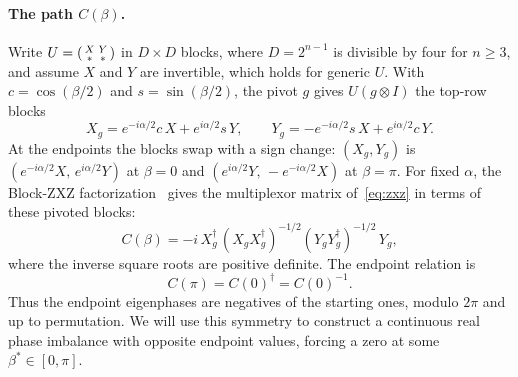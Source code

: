 \documentclass[11pt]{article}
\begin{document}
\paragraph{The path $C(\beta)$.} Write $U=\begin{psmallmatrix}X&Y\\ \ast&\ast\end{psmallmatrix}$
in $D\times D$ blocks, where $D=2^{n-1}$ is divisible by four for $n\ge3$, and assume $X$ and $Y$ are
invertible, which holds for generic $U$. With $c=\cos(\beta/2)$ and $s=\sin(\beta/2)$, the pivot
$g$ gives $U(g\otimes I)$ the top-row blocks
\begin{equation}\label{eq:path}
X_g=e^{-i\alpha/2}c\,X+e^{i\alpha/2}s\,Y,\qquad
Y_g=-e^{-i\alpha/2}s\,X+e^{i\alpha/2}c\,Y .
\end{equation}
At the endpoints the blocks swap with a sign change: $(X_g,Y_g)$ is
$(e^{-i\alpha/2}X,\,e^{i\alpha/2}Y)$ at $\beta=0$ and $(e^{i\alpha/2}Y,\,-e^{-i\alpha/2}X)$ at
$\beta=\pi$.
For fixed $\alpha$, the Block-ZXZ factorization~\cite[Sec.~4.1]{zxz} gives the
multiplexor matrix of~\eqref{eq:zxz} in terms of these pivoted blocks:
\begin{equation}\label{eq:Cdef}
C(\beta)=-i\,X_g^\dagger\,(X_gX_g^\dagger)^{-1/2}(Y_gY_g^\dagger)^{-1/2}\,Y_g,
\end{equation}
where the inverse square roots are positive definite. The endpoint relation is
\begin{equation}\label{eq:inv}
C(\pi)=C(0)^\dagger=C(0)^{-1}.
\end{equation}
Thus the endpoint eigenphases are negatives of the starting ones, modulo $2\pi$ and up to
permutation. We will use this symmetry to construct a continuous real phase imbalance with
opposite endpoint values, forcing a zero at some $\beta^\ast\in[0,\pi]$.
\end{document}
